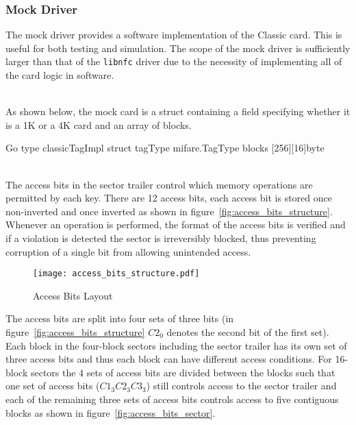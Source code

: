 \documentclass[dissertation.tex]{subfiles}
\begin{document}
  \subsubsection{Mock Driver}

  The mock driver provides a software implementation of the \mifare{} Classic card. This is useful for both testing and simulation. The scope of the mock driver is sufficiently larger than that of the \texttt{libnfc} driver due to the necessity of implementing all of the card logic in software.

   \\
  As shown below, the mock card is a struct containing a field specifying whether it is a 1K or a 4K card and an array of blocks.

  \begin{code}[numbers=none]{Go}
    type classicTagImpl struct {
    	tagType mifare.TagType
    	blocks  [256][16]byte
    }
  \end{code}

   \\
  The access bits in the sector trailer control which memory operations are permitted by each key. There are 12 access bits, each access bit is stored once non-inverted and once inverted as shown in figure~\vref{fig:access_bits_structure}. Whenever an operation is performed, the format of the access bits is verified and if a violation is detected the sector is irreversibly blocked, thus preventing corruption of a single bit from allowing unintended access.

  \begin{figure}[h]
    \centering
    \texttt{[image: access\_bits\_structure.pdf]}
    \caption{Access Bits Layout}\label{fig:access_bits_structure}
  \end{figure}

  The access bits are split into four sets of three bits (in figure~\vref{fig:access_bits_structure} $C2_0$ denotes the second bit of the first set). Each block in the four-block sectors including the sector trailer has its own set of three access bits and thus each block can have different access conditions. For 16-block sectors the 4 sets of access bits are divided between the blocks such that one set of access bits ($C1_3 C2_3 C3_3$) still controls access to the sector trailer and each of the remaining three sets of access bits controls access to five contiguous blocks as shown in figure~\vref{fig:access_bits_sector}.
\end{document}
